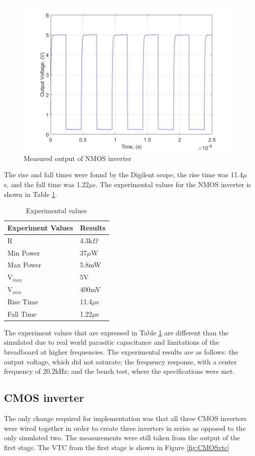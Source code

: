  
 \begin{figure}[H]
    \centering
    \includegraphics[width=.6\textwidth]{ExperimentalImplementation/nmos_waveform.jpg}
    \caption{Measured output of NMOS inverter}
    \label{fig:voutnmos}
\end{figure}
 
 The rise and fall times were found by the Digilent scope, the rise time was 11.4$\mu$s, and the fall time was 1.22$\mu$s. The experimental values for the NMOS inverter is shown in Table \ref{tab:expvalue}.

\begin{table}[H]
\centering
\caption{Experimental values}
\label{tab:expvalue}
\begin{tabular}{|l|l|}
\hline
Experiment Values & Results      \\ \hline
R                 & 4.3k$\Omega$ \\ \hline
Min Power         & 37$\mu$W     \\ \hline
Max Power         & 5.8mW        \\ \hline
V$_{max}$         & 5V           \\ \hline
V$_{min}$         & 400mV         \\ \hline
Rise Time         & 11.4$\mu$s       \\ \hline
Fall Time         & 1.22$\mu$s        \\ \hline
\end{tabular}
\end{table}


The experiment values that are expressed in Table \ref{tab:expvalue} are different than the simulated due to real world parasitic capacitance and limitations of the breadboard at higher frequencies.
The experimental results are as follows: the output voltage, which did not saturate; the frequency response, with a center frequency of 20.2kHz; and the bench test, where the specifications were met.

\subsection{CMOS inverter}
The only change required for implementation was that all three CMOS inverters were wired together in order to create three inverters in series as opposed to the only simulated two. The measurements were still taken from the output of the first stage.
The VTC from the first stage is shown in Figure \ref{fig:CMOSvtc}


